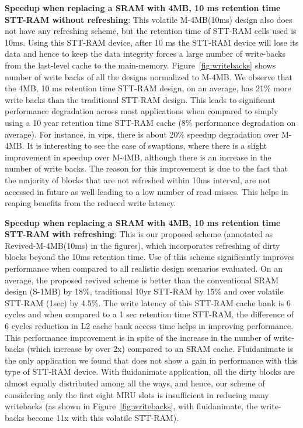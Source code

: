 {\bf Speedup when replacing a SRAM with 4MB, 10 ms retention time STT-RAM without refreshing}: This volatile M-4MB(10ms) design also does not have any refreshing scheme, but the retention time of STT-RAM cells used is 10ms. Using this STT-RAM device, after 10 ms the STT-RAM device will lose its data and hence to keep the data integrity forces a large number of write-backs from the last-level cache to the main-memory. Figure~\ref{fig:writebacks} shows number of write backs of all the designs normalized to M-4MB. We observe that the 4MB, 10 ms retention time STT-RAM design, on an average, has 21\% more write backs than the traditional STT-RAM design.
This leads to significant performance degradation across most applications when compared to simply using a 10 year retention time STT-RAM cache (8\% performance degradation on average). For instance, in vips, there is about 20\% speedup
degradation over M-4MB. It is interesting to see the case of swaptions, where there is a slight improvement in speedup over M-4MB, although
there is an increase in the number of write backs. The reason for this improvement is due to the fact that the majority of blocks that are not refreshed within 10ms interval, are not accessed in future as well leading to a low number of read misses. This helps in reaping benefits from the reduced write latency.

{\bf Speedup when replacing a SRAM with 4MB, 10 ms retention time STT-RAM with refreshing}: This is our proposed scheme (annotated as Revived-M-4MB(10ms) in the figures), which incorporates refreshing of dirty blocks beyond the 10ms retention time.
Use of this scheme significantly improves performance when compared to all realistic design scenarios evaluated. On an average, the proposed revived scheme is better than the conventional SRAM design (S-1MB) by 18\%, traditional 10yr STT-RAM by 15\% and over volatile STT-RAM (1sec)
by 4.5\%. The write latency of this STT-RAM cache bank is 6 cycles and when compared to a 1 sec retention time STT-RAM, the difference of 6 cycles reduction in L2 cache bank access time helps in improving performance. This performance improvement is in spite of the increase in the number of write-backs (which increase by over 2x) compared to an SRAM cache. Fluidanimate is the only application we found that does not show a gain in performance with this type of STT-RAM device. With fluidanimate application, all the dirty blocks are almost equally distributed among all the ways, and hence, our scheme of considering only the first eight MRU slots is insufficient in reducing many writebacks (as shown in Figure~\ref{fig:writebacks}, with fluidanimate, the write-backs become 11x with this volatile STT-RAM).

